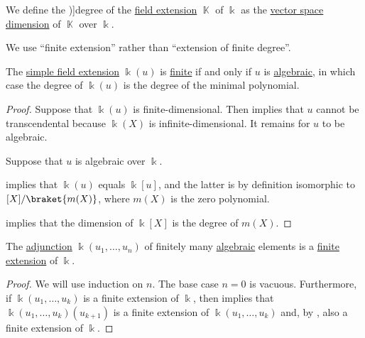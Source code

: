 \begin{definition}\label{def:field_extension_degree}
  We define the \term[ru=степень (def. \cite[9.5.1]{Винберг2014})]{degree} of the \hyperref[def:field/submodel]{field extension} \( \BbbK \) of \( \Bbbk \) as the \hyperref[thm:vector_space_dimension]{vector space dimension} of \( \BbbK \) over \( \Bbbk \).

  We use \enquote{finite extension} rather than \enquote{extension of finite degree}.
\end{definition}

\begin{proposition}\label{thm:simple_extension_dimension}
  The \hyperref[def:simple_field_extension]{simple field extension} \( \Bbbk(u) \) is \hyperref[def:field_extension_degree]{finite} if and only if \( u \) is \hyperref[def:algebraic_element]{algebraic}, in which case the degree of \( \Bbbk(u) \) is the degree of the minimal polynomial.
\end{proposition}
\begin{proof}
  \SufficiencySubProof Suppose that \( \Bbbk(u) \) is finite-dimensional. Then  implies that \( u \) cannot be transcendental because \( \Bbbk(X) \) is infinite-dimensional. It remains for \( u \) to be algebraic.

  \NecessitySubProof Suppose that \( u \) is algebraic over \( \Bbbk \).

   implies that \( \Bbbk(u) \) equals \( \Bbbk[u] \), and the latter is by definition isomorphic to \( \Bbbk[X] / \braket{ m(X) } \), where \( m(X) \) is the zero polynomial.

   implies that the dimension of \( \Bbbk[X] \) is the degree of \( m(X) \).
\end{proof}

\begin{proposition}\label{thm:finite_adjunction_finite_extension}
  The \hyperref[def:field_adjunction]{adjunction} \( \Bbbk(u_1, \ldots, u_n) \) of finitely many \hyperref[def:algebraic_element]{algebraic} elements is a \hyperref[def:field_extension_degree]{finite extension} of \( \Bbbk \).
\end{proposition}
\begin{proof}
  We will use induction on \( n \). The base case \( n = 0 \) is vacuous. Furthermore, if \( \Bbbk(u_1, \ldots, u_k) \) is a finite extension of \( \Bbbk \), then  implies that \( \Bbbk(u_1, \ldots, u_k)(u_{k+1}) \) is a finite extension of \( \Bbbk(u_1, \ldots, u_k) \) and, by , also a finite extension of \( \Bbbk \).
\end{proof}

